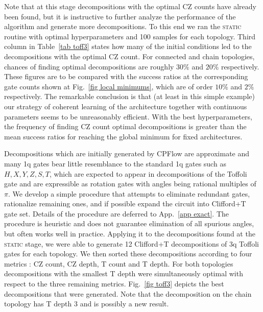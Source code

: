 \documentclass[twocolumn, amsfonts, amssymb, aps, nofootinbib]{revtex4-2}
\newcommand{\CZ}{\textsf{CZ }}
\newcommand{\T}{\textsf{T }}
\newcommand{\package}[1]{\textrm {#1 }}
\newcommand{\cpflow}{\package{CPFlow}}
\newcommand{\static}{\textsc{static }}
\begin{document}
Note that at this stage decompositions with the optimal \CZ counts have already been found, but it is instructive to further analyze the performance of the algorithm and generate more decompositions. To this end we ran the \static routine with optimal hyperparameters and 100 samples for each topology. Third column in Table~\ref{tab toff3} states how many of the initial conditions led to the decompositions with the optimal \CZ count. For connected and chain topologies, chances of finding optimal decompositions are roughly $30\%$ and $20\%$ respectively. These figures are to be compared with the success ratios at the corresponding gate counts shown at Fig.~\ref{fig local minimums}, which are of order $10\%$ and $2\%$ respectively. The remarkable conclusion is that (at least in this simple example) our strategy of coherent learning of the architecture together with continuous parameters seems to be unreasonably efficient. With the best hyperparameters, the frequency of finding \CZ count optimal decompositions is greater than the mean success ratios for reaching the global minimum for fixed architectures.

Decompositions which are initially generated by \cpflow are approximate and many 1q gates bear little resemblance to the standard 1q gates such as $H, X, Y, Z, S, T$, which are expected to appear in decompositions of the Toffoli gate and are expressible as rotation gates with angles being rational multiples of $\pi$. We develop a simple procedure that attempts to eliminate redundant gates, rationalize remaining ones, and if possible expand the circuit into Clifford+T gate set. Details of the procedure are deferred to App.~\ref{app exact}. The procedure is heuristic and does not guarantee elimination of all spurious angles, but often works well in practice. Applying it to the decompositions found at the \static stage, we were able to generate 12 Clifford+T decompositions of 3q Toffoli gates for each topology. We then sorted these decompositions according to four metrics : \CZ count, \CZ depth, \T count and \T depth. For both topologies decompositions with the smallest \T  depth were simultaneously optimal with respect to the three remaining metrics. Fig.~\ref{fig toff3} depicts the best decompositions that were generated. Note that the decomposition on the chain topology has \T depth 3 and is possibly a new result.
\end{document}
